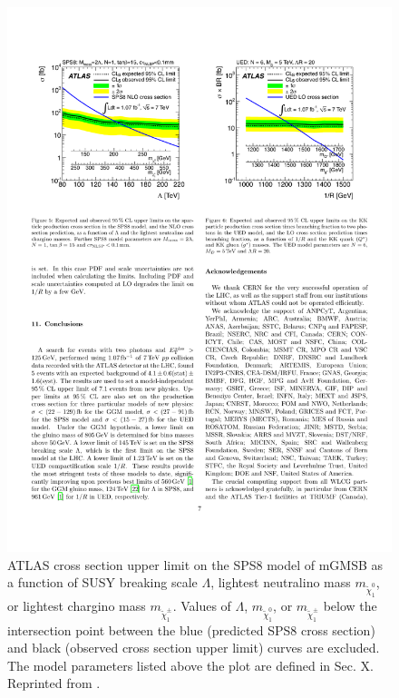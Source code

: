 \documentclass[12pt, letterpaper]{report}
\begin{document}
\begin{figure}
	\centering
	\includegraphics[scale=0.9]{ATLAS_SPS8_limit}
	\caption{ATLAS cross section upper limit on the SPS8 \cite{SPS} model of mGMSB as a function of SUSY breaking scale $\Lambda$, lightest neutralino mass $m_{\widetilde{\chi}_{1}^{0}}$, or lightest chargino mass $m_{\widetilde{\chi}_{1}^{\pm}}$.  Values of $\Lambda$, $m_{\widetilde{\chi}_{1}^{0}}$, or $m_{\widetilde{\chi}_{1}^{\pm}}$ below the intersection point between the blue (predicted SPS8 cross section) and black (observed cross section upper limit) curves are excluded.  The model parameters listed above the plot are defined in Sec. X.  Reprinted from \cite{ATLAS_GMSB_1fb-1}.}
\end{figure}
\end{document}
